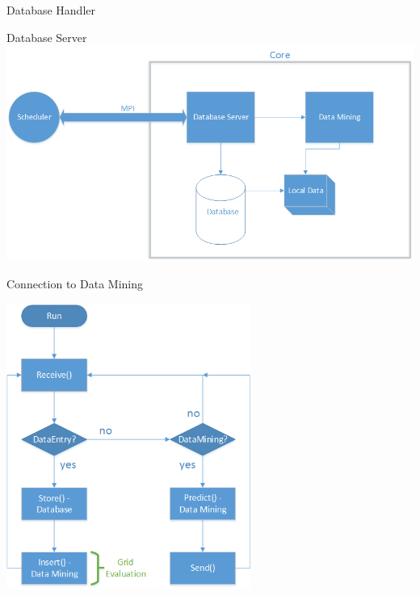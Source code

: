 \begin{frame}{Database Handler}
	\end{frame}
	
	\begin{frame}{Database Server}
	\includegraphics[width=1.0\textwidth]{images/databaseserver.png}
	\end{frame}
	
	\begin{frame}{Connection to Data Mining}
	\begin{center}
	\includegraphics[height=0.64\textwidth, width=0.6\textwidth]{images/datamining_flow0.png}
	\end{center}
	\end{frame}
	
